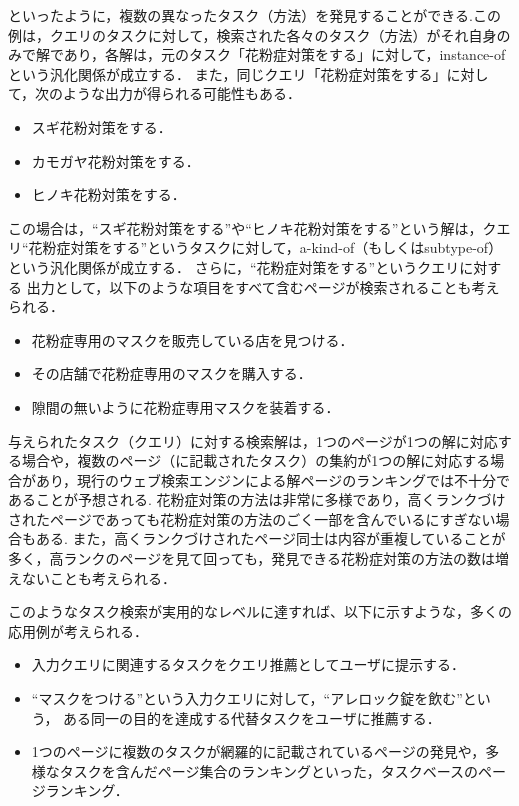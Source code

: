 \documentclass[submit,techreq]{ipsj}
\begin{document}
といったように，複数の異なったタスク（方法）を発見することができる.この例は，クエリのタスクに対して，検索された各々のタスク（方法）がそれ自身のみで解であり，各解は，元のタスク「花粉症対策をする」に対して，instance-ofという汎化関係が成立する．
また，同じクエリ「花粉症対策をする」に対して，次のような出力が得られる可能性もある．
\begin{itemize}
\item スギ花粉対策をする．
\item カモガヤ花粉対策をする．
\item ヒノキ花粉対策をする．
\end{itemize}
この場合は，``スギ花粉対策をする''や``ヒノキ花粉対策をする''という解は，クエリ``花粉症対策をする''というタスクに対して，a-kind-of（もしくはsubtype-of）という汎化関係が成立する．
さらに，``花粉症対策をする''というクエリに対する
出力として，以下のような項目をすべて含むページが検索されることも考えられる．
\begin{itemize}
\item 花粉症専用のマスクを販売している店を見つける．
\item その店舗で花粉症専用のマスクを購入する．
\item 隙間の無いように花粉症専用マスクを装着する．
\end{itemize}
与えられたタスク（クエリ）に対する検索解は，1つのページが1つの解に対応する場合や，複数のページ（に記載されたタスク）の集約が1つの解に対応する場合があり，現行のウェブ検索エンジンによる解ページのランキングでは不十分であることが予想される. 
花粉症対策の方法は非常に多様であり，高くランクづけされたページであっても花粉症対策の方法のごく一部を含んでいるにすぎない場合もある. 
また，高くランクづけされたページ同士は内容が重複していることが多く，高ランクのページを見て回っても，発見できる花粉症対策の方法の数は増えないことも考えられる．

このようなタスク検索が実用的なレベルに達すれば、以下に示すような，多くの応用例が考えられる．
\begin{itemize}
\item 入力クエリに関連するタスクをクエリ推薦としてユーザに提示する．
\item ``マスクをつける''という入力クエリに対して，``アレロック錠を飲む''という，
ある同一の目的を達成する代替タスクをユーザに推薦する．
\item 1つのページに複数のタスクが網羅的に記載されているページの発見や，多様なタスクを含んだページ集合のランキングといった，タスクベースのページランキング．
\end{itemize}
\end{document}
